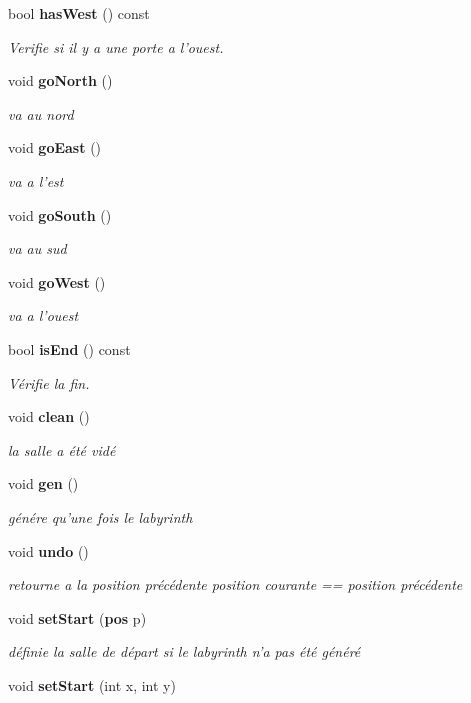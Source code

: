 \begin{DoxyCompactItemize}
bool {\bf has\-West} () const 
\begin{DoxyCompactList}\small\item\em Verifie si il y a une porte a l'ouest. \end{DoxyCompactList}\item 
void {\bf go\-North} ()
\begin{DoxyCompactList}\small\item\em va au nord \end{DoxyCompactList}\item 
void {\bf go\-East} ()
\begin{DoxyCompactList}\small\item\em va a l'est \end{DoxyCompactList}\item 
void {\bf go\-South} ()
\begin{DoxyCompactList}\small\item\em va au sud \end{DoxyCompactList}\item 
void {\bf go\-West} ()
\begin{DoxyCompactList}\small\item\em va a l'ouest \end{DoxyCompactList}\item 
bool {\bf is\-End} () const 
\begin{DoxyCompactList}\small\item\em Vérifie la fin. \end{DoxyCompactList}\item 
void {\bf clean} ()
\begin{DoxyCompactList}\small\item\em la salle a été vidé \end{DoxyCompactList}\item 
void {\bf gen} ()
\begin{DoxyCompactList}\small\item\em génére qu'une fois le labyrinth \end{DoxyCompactList}\item 
void {\bf undo} ()
\begin{DoxyCompactList}\small\item\em retourne a la position précédente position courante == position précédente \end{DoxyCompactList}\item 
void {\bf set\-Start} ({\bf pos} p)
\begin{DoxyCompactList}\small\item\em définie la salle de départ si le labyrinth n'a pas été généré \end{DoxyCompactList}\item 
void {\bf set\-Start} (int x, int y)
\end{DoxyCompactItemize}

